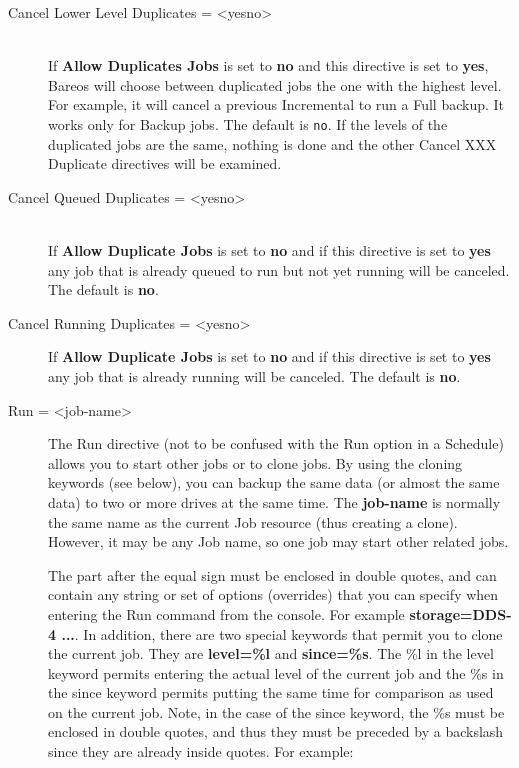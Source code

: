 \begin{description}
\item [Cancel Lower Level Duplicates = {\textless}yes{\textbar}no{\textgreater}] \hfill \\
If \textbf{Allow Duplicates Jobs} is set to \textbf{no} and this
directive is set to \textbf{yes}, Bareos will choose between duplicated
jobs the one with the highest level.  For example, it will cancel a
previous Incremental to run a Full backup.  It works only for Backup
jobs.  The default is \texttt{no}. If the levels of the duplicated
jobs are the same, nothing is done and the other
Cancel XXX Duplicate directives will be examined.

\item [Cancel Queued Duplicates = {\textless}yes{\textbar}no{\textgreater}] \hfill \\
If {\bf Allow Duplicate Jobs} is set to {\bf no} and
if this directive is set to {\bf yes} any job that is
already queued to run but not yet running will be canceled.
The default is {\bf no}.

\item[Cancel Running Duplicates = {\textless}yes{\textbar}no{\textgreater}]
If {\bf Allow Duplicate Jobs} is set to {\bf no} and
if this directive is set to {\bf yes} any job that is already running
will be canceled.  The default is {\bf no}.


\item [Run = {\textless}job-name{\textgreater}]
The Run directive (not to be confused with the Run option in a
Schedule) allows you to start other jobs or to clone jobs. By using the
cloning keywords (see below), you can backup
the same data (or almost the same data) to two or more drives
at the same time. The {\bf job-name} is normally the same name
as the current Job resource (thus creating a clone). However, it
may be any Job name, so one job may start other related jobs.

The part after the equal sign must be enclosed in double quotes,
and can contain any string or set of options (overrides) that you
can specify when entering the Run command from the console. For
example {\bf storage=DDS-4 ...}.  In addition, there are two special
keywords that permit you to clone the current job. They are {\bf level=\%l}
and {\bf since=\%s}. The \%l in the level keyword permits
entering the actual level of the current job and the \%s in the since
keyword permits putting the same time for comparison as used on the
current job.  Note, in the case of the since keyword, the \%s must be
enclosed in double quotes, and thus they must be preceded by a backslash
since they are already inside quotes. For example:


\end{description}
